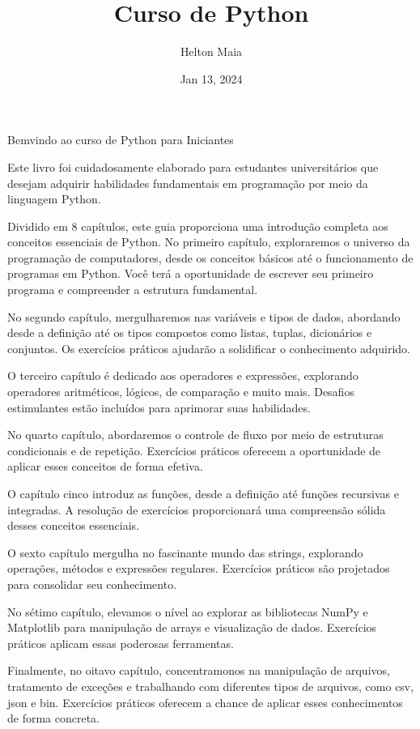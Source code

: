 \documentclass[letterpaper,10pt,english]{jupyterBook}
\title{Curso de Python}
\date{Jan 13, 2024}
\author{Helton Maia}
\begin{document}
\pagestyle{empty}
\sphinxmaketitle
\pagestyle{plain}
\sphinxtableofcontents
\pagestyle{normal}
\label{\detokenize{intro::doc}}


\sphinxAtStartPar
Bem\sphinxhyphen{}vindo ao curso de Python para Iniciantes

\sphinxAtStartPar
Este livro foi cuidadosamente elaborado para estudantes universitários que desejam adquirir habilidades fundamentais em programação por meio da linguagem Python.

\sphinxAtStartPar
Dividido em 8 capítulos, este guia proporciona uma introdução completa aos conceitos essenciais de Python. No primeiro capítulo, exploraremos o universo da programação de computadores, desde os conceitos básicos até o funcionamento de programas em Python. Você terá a oportunidade de escrever seu primeiro programa e compreender a estrutura fundamental.

\sphinxAtStartPar
No segundo capítulo, mergulharemos nas variáveis e tipos de dados, abordando desde a definição até os tipos compostos como listas, tuplas, dicionários e conjuntos. Os exercícios práticos ajudarão a solidificar o conhecimento adquirido.

\sphinxAtStartPar
O terceiro capítulo é dedicado aos operadores e expressões, explorando operadores aritméticos, lógicos, de comparação e muito mais. Desafios estimulantes estão incluídos para aprimorar suas habilidades.

\sphinxAtStartPar
No quarto capítulo, abordaremos o controle de fluxo por meio de estruturas condicionais e de repetição. Exercícios práticos oferecem a oportunidade de aplicar esses conceitos de forma efetiva.

\sphinxAtStartPar
O capítulo cinco introduz as funções, desde a definição até funções recursivas e integradas. A resolução de exercícios proporcionará uma compreensão sólida desses conceitos essenciais.

\sphinxAtStartPar
O sexto capítulo mergulha no fascinante mundo das strings, explorando operações, métodos e expressões regulares. Exercícios práticos são projetados para consolidar seu conhecimento.

\sphinxAtStartPar
No sétimo capítulo, elevamos o nível ao explorar as bibliotecas NumPy e Matplotlib para manipulação de arrays e visualização de dados. Exercícios práticos aplicam essas poderosas ferramentas.

\sphinxAtStartPar
Finalmente, no oitavo capítulo, concentramo\sphinxhyphen{}nos na manipulação de arquivos, tratamento de exceções e trabalhando com diferentes tipos de arquivos, como csv, json e bin. Exercícios práticos oferecem a chance de aplicar esses conhecimentos de forma concreta.
\end{document}
